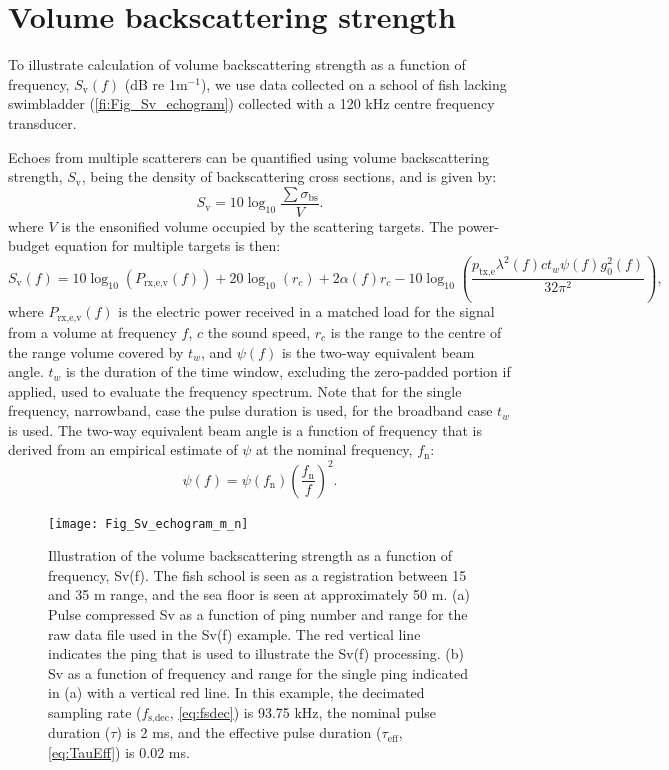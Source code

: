 \documentclass[preprint,12pt,TurnOnLineNumbers]{JASAnew}
\newcommand{\freqsym}{f}
\newcommand{\fsdec}{f_{\textrm{s,dec}}}
\newcommand{\fn}{f_{\textrm{n}}}
\newcommand{\ptxe}{p_{\textrm{tx,e}}}
\newcommand{\tnom}{\tau}
\newcommand{\teff}{\tau_{\textrm{eff}}}
\newcommand{\prxevf}{P_{\textrm{rx,e,v}}}
\newcommand{\tslide}{t_w}
\newcommand{\bs}{\sigma_{\textrm{bs}}}
\newcommand{\sv}{S_{\textrm{v}}}
\newcommand{\range}{r}
\newcommand{\gainzero}{g_0}
\newcommand{\eqang}{\psi}
\newcommand{\wlen}{\lambda}
\newcommand{\cw}{c}
\newcommand{\absorp}{\alpha}
\begin{document}
\section{Volume backscattering strength}

To illustrate calculation of volume backscattering strength as a function of frequency,  $\sv(f)$ (dB re 1m$^{-1}$), we use data collected on a school of fish lacking swimbladder (\autoref{fi:Fig_Sv_echogram}) collected with a 120 kHz centre frequency transducer. 

Echoes from multiple scatterers can be quantified using volume backscattering strength, $\sv$, being the density of backscattering cross sections, and is given by:
%
\begin{equation}
\label{eq:sv}
\sv  =  10\log_{10}\frac{\sum\bs}{V}.
\end{equation}
%
where $V$ is the ensonified volume occupied by the scattering targets. The power-budget equation for multiple targets is then:
%
\begin{equation}
\label{eq:sv_f}
\sv(\freqsym) = 10\log_{10}(\prxevf(\freqsym)) + 20\log_{10}(\range_c) + 2\absorp(\freqsym)\range_c 
- 10\log_{10}\left( \frac{\ptxe \wlen^2(\freqsym) \cw \tslide \eqang(\freqsym) \gainzero^2(\freqsym)}{32\pi^2} \right), 
\end{equation}
%
where $\prxevf(\freqsym)$ is the electric power received in a matched load for the signal from a volume at frequency $\freqsym$, $\cw$ the sound speed, $\range_c$ is the range to the centre of the range volume covered by $\tslide$, and $\eqang(\freqsym)$ is the two-way equivalent beam angle. $\tslide$ is the duration of the time window, excluding the zero-padded portion if applied, used to evaluate the frequency spectrum. Note that for the single frequency, narrowband, case the pulse duration is used, for the broadband case $\tslide$ is used. The two-way equivalent beam angle is a function of frequency that is derived from an empirical estimate of $\eqang$ at the nominal frequency, $\fn$:
\begin{equation}
\label{eq:PsiFc}
\eqang(f) = \eqang(\fn)\left(\frac{\fn}{f}\right)^2.
\end{equation}

\begin{figure}
\texttt{[image: Fig\_Sv\_echogram\_m\_n]}
\caption{\label{fi:Fig_Sv_echogram} Illustration of the volume backscattering strength as a function of frequency, Sv(f). The fish school is seen as a registration between 15 and 35 m range, and the sea floor is seen at approximately 50 m. (a) Pulse compressed Sv as a function of ping number and range for the raw data file used in the Sv(f) example. The red vertical line indicates the ping that is used to illustrate the Sv(f) processing. (b) Sv as a function of frequency and range for the single ping indicated in (a) with a vertical red line. In this example, the decimated sampling rate ($\fsdec$, \autoref{eq:fsdec}) is 93.75 kHz, the nominal pulse duration ($\tnom$) is 2 ms, and the effective pulse duration ($\teff$, \autoref{eq:TauEff}) is 0.02 ms.}
\end{figure}
\end{document}

